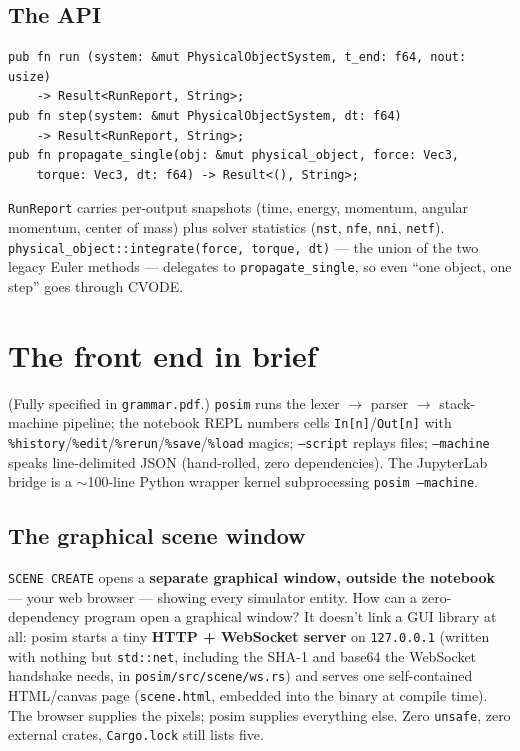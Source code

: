 \documentclass[11pt]{article}
\newcommand{\code}[1]{\texttt{#1}}
\begin{document}
\subsection{The API}
\begin{lstlisting}[language=RustLite]
pub fn run (system: &mut PhysicalObjectSystem, t_end: f64, nout: usize)
    -> Result<RunReport, String>;
pub fn step(system: &mut PhysicalObjectSystem, dt: f64)
    -> Result<RunReport, String>;
pub fn propagate_single(obj: &mut physical_object, force: Vec3,
    torque: Vec3, dt: f64) -> Result<(), String>;
\end{lstlisting}
\code{RunReport} carries per-output snapshots (time, energy, momentum,
angular momentum, center of mass) plus solver statistics
(\code{nst}, \code{nfe}, \code{nni}, \code{netf}).
\code{physical\_object::integrate(force, torque, dt)} --- the union of
the two legacy Euler methods --- delegates to
\code{propagate\_single}, so even ``one object, one step'' goes through
CVODE.

\section{The front end in brief}

(Fully specified in \code{grammar.pdf}.) \code{posim} runs the
lexer $\to$ parser $\to$ stack-machine pipeline; the notebook REPL
numbers cells \code{In[n]}/\code{Out[n]} with
\code{\%history}/\code{\%edit}/\code{\%rerun}/\code{\%save}/\code{\%load}
magics; \code{--script} replays files; \code{--machine} speaks
line-delimited JSON (hand-rolled, zero dependencies). The JupyterLab
bridge is a $\sim$100-line Python wrapper kernel subprocessing
\code{posim --machine}.

\subsection{The graphical scene window}

\code{SCENE CREATE} opens a \textbf{separate graphical window, outside
the notebook} --- your web browser --- showing every simulator entity.
How can a zero-dependency program open a graphical window? It doesn't
link a GUI library at all: posim starts a tiny \textbf{HTTP +
WebSocket server} on \code{127.0.0.1} (written with nothing but
\code{std::net}, including the SHA-1 and base64 the WebSocket handshake
needs, in \code{posim/src/scene/ws.rs}) and serves one self-contained
HTML/canvas page (\code{scene.html}, embedded into the binary at
compile time). The browser supplies the pixels; posim supplies
everything else. Zero \code{unsafe}, zero external crates,
\code{Cargo.lock} still lists five.
\end{document}
